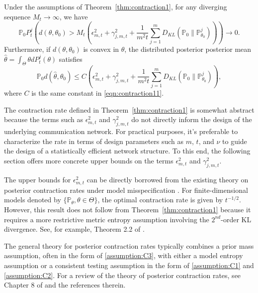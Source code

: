 \documentclass[twoside,11pt]{article}
\numberwithin{equation}{section}
\newcommand\bP{\mathbb{P}}
\begin{document}
{\begin{corollary}\label{cor:contraction1}
    Under the assumptions of Theorem~\ref{thm:contraction1}, for any diverging sequence $M_t \to \infty$, we have 
    \begin{equation*}
         \bP_0 P_t^j \left(d(\theta, \theta_0) > M_t \left(\epsilon_{m,t}^2 + \gamma_{j,m,t}^2 +  \frac{1}{m^2 t} \sum_{j = 1}^m D_{KL}(\bP_0 \parallel \bP_{\theta_0}^j) \right) \right) \to 0. 
    \end{equation*}
    Furthermore, if $d(\theta, \theta_0)$ is convex in $\theta$, the distributed posterior posterior mean $\hat \theta = \int_\Theta \theta dP_t^j(\theta)$ satisfies 
    \begin{equation*}
       \bP_0  d(\hat \theta, \theta_0) \leq C\left(\epsilon_{m,t}^2 + \gamma_{j,m,t}^2 + \frac{1}{m^2 t} \sum_{j = 1}^m D_{KL}(\bP_0 \parallel \bP_{\theta_0}^j) \right), 
    \end{equation*}
where $C$ is the same constant in \eqref{eqn:contraction11}.  
\end{corollary}

The contraction rate defined in Theorem~\ref{thm:contraction1} is somewhat abstract because the terms such as $\epsilon_{m,t}^2$ and $\gamma_{j,m,t}^2$ do not directly inform the design of the underlying communication network. For practical purposes, it's preferable to characterize the rate in terms of design parameters such as \(m\), \(t\), and \(\nu\) to guide the design of a statistically efficient network structure. To this end, the following section offers more concrete upper bounds on the terms \(\epsilon_{m,t}^2\) and \(\gamma_{j,m,t}^2\).

The upper bounds for $\epsilon_{m,t}^2$ can be directly borrowed from the existing theory on posterior contraction rates under model misspecification \citep{Kleijn2012}. For finite-dimensional models denoted by $\{ \mathbb{P}_\theta, \theta \in \Theta \}$, the optimal contraction rate is given by $t^{-1/2}$. However, this result does not follow from Theorem~\ref{thm:contraction1} because it requires a more restrictive metric entropy assumption involving the $2^{nd}$-order KL divergence. See, for example, Theorem 2.2 of \cite{Kleijn2012}. 

The general theory for posterior contraction rates typically combines a prior mass assumption, often in the form of \ref{assumption:C3}, with either a model entropy assumption or a consistent testing assumption in the form of \ref{assumption:C1} and \ref{assumption:C2}. For a review of the theory of posterior contraction rates, see Chapter 8 of \cite{ghosal2017fundamentals} and the references therein.

}
\end{document}
